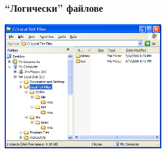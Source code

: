 \documentclass{beamer}
\begin{document}
\begin{frame}[fragile]
\frametitle{``Логически'' файлове}


\begin{center}
   \includegraphics[width=7cm]{images/directorytree}
\end{center}

\end{frame}
\end{document}
